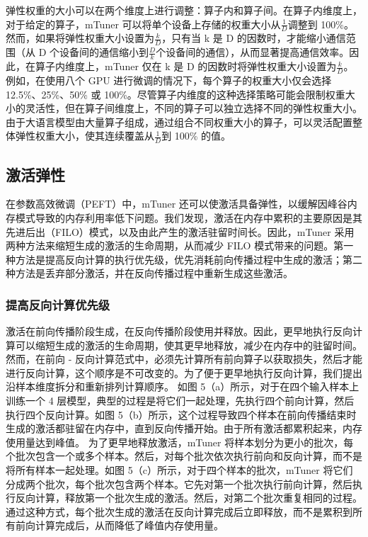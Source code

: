 弹性权重的大小可以在两个维度上进行调整：算子内和算子间。在算子内维度上，对于给定的算子，mTuner 可以将单个设备上存储的权重大小从\(\frac{1}{D}\)调整到 100\%。
然而，如果将弹性权重大小设置为\(\frac{k}{D}\)，只有当 k 是 D 的因数时，才能缩小通信范围（从 D 个设备间的通信缩小到\(\frac{D}{k}\)个设备间的通信），从而显著提高通信效率。因此，在算子内维度上，mTuner 仅在 k 是 D 的因数时将弹性权重大小设置为\(\frac{k}{D}\)。例如，在使用八个 GPU 进行微调的情况下，每个算子的权重大小仅会选择 12.5\%、25\%、50\% 或 100\%。尽管算子内维度的这种选择策略可能会限制权重大小的灵活性，但在算子间维度上，不同的算子可以独立选择不同的弹性权重大小。由于大语言模型由大量算子组成，通过组合不同权重大小的算子，可以灵活配置整体弹性权重大小，使其连续覆盖从\(\frac{1}{D}\)到 100\% 的值。

\subsection{激活弹性}
在参数高效微调（PEFT）中，mTuner 还可以使激活具备弹性，以缓解因峰谷内存模式导致的内存利用率低下问题。我们发现，激活在内存中累积的主要原因是其先进后出（FILO）模式，以及由此产生的激活驻留时间长。因此，mTuner 采用两种方法来缩短生成的激活的生命周期，从而减少 FILO 模式带来的问题。第一种方法是提高反向计算的执行优先级，优先消耗前向传播过程中生成的激活；第二种方法是丢弃部分激活，并在反向传播过程中重新生成这些激活。
\subsubsection{提高反向计算优先级}
激活在前向传播阶段生成，在反向传播阶段使用并释放。因此，更早地执行反向计算可以缩短生成的激活的生命周期，使其更早地释放，减少在内存中的驻留时间。然而，在前向 - 反向计算范式中，必须先计算所有前向算子以获取损失，然后才能进行反向计算，这个顺序是不可改变的。为了便于更早地执行反向计算，我们提出沿样本维度拆分和重新排列计算顺序。
如图 5（a）所示，对于在四个输入样本上训练一个 4 层模型，典型的过程是将它们一起处理，先执行四个前向计算，然后执行四个反向计算。如图 5（b）所示，这个过程导致四个样本在前向传播结束时生成的激活都驻留在内存中，直到反向传播开始。由于所有激活都累积起来，内存使用量达到峰值。
为了更早地释放激活，mTuner 将样本划分为更小的批次，每个批次包含一个或多个样本。然后，对每个批次依次执行前向和反向计算，而不是将所有样本一起处理。如图 5（c）所示，对于四个样本的批次，mTuner 将它们分成两个批次，每个批次包含两个样本。它先对第一个批次执行前向计算，然后执行反向计算，释放第一个批次生成的激活。然后，对第二个批次重复相同的过程。通过这种方式，每个批次生成的激活在反向计算完成后立即释放，而不是累积到所有前向计算完成后，从而降低了峰值内存使用量。
